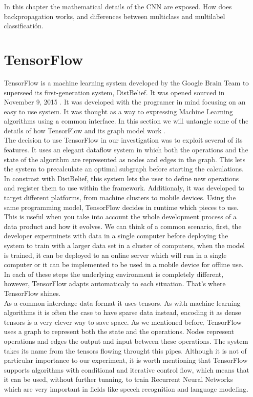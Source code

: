 In this chapter the mathematical details of the CNN are exposed. How does backpropagation works, and differences between multiclass and multilabel classificatión.

\section{TensorFlow}

TensorFlow is a machine learning system developed by the Google Brain Team to superseed its first-generation system, DistBelief. It was opened sourced in November 9, 2015 \cite{tensorflow2015-whitepaper}. It was developed with the programer in mind focusing on an easy to use system. It was thought as a way to expressing Machine Learning algorithms using a common interface. In this section we will untangle some of the details of how TensorFlow and its graph model work \cite{DBLP:journals/corr/AbadiBCCDDDGIIK16}.\\

The decision to use TensorFlow in our investigation was to exploit several of its features. It uses an elegant dataflow system in which both the operations and the state of the algorithm are represented as nodes and edges in the graph. This lets the system to precalculate an optimal subgraph before starting the calculations.\\

In constrast with DistBelief, this system lets the user to define new operations and register them to use within the framework. Additionaly, it was developed to target different platforms, from machine clusters to mobile devices. Using the same programming model, TensorFlow decides in runtime which pieces to use. This is useful when you take into account the whole development process of a data product and how it evolves. We can think of a common scenario, first, the developer experminets with data in a single computer before deploying the system to train with a larger data set in a cluster of computers, when the model is trained, it can be deployed to an online server which will run in a single computer or it can be implemented to be used in a mobile device for offline use. In each of these steps the underlying environment is completely different, however, TensorFlow adapts automaticaly to each situation. That's where TensorFlow shines.\\

As a common interchage data format it uses tensors. As with machine learning algorithms it is often the case to have sparse data instead, encoding it as dense tensors is a very clever way to save space. As we mentioned before, TensorFlow uses a graph to represent both the state and the operations. Nodes represent operations and edges the output and input between these operations. The system takes its name from the tensors flowing throught this pipes. Although it is not of particular importance to our experiment, it is worth mentioning that TensorFlow supports algorithms with conditional and iterative control flow, which means that it can be used, without further tunning, to train Recurrent Neural Networks which are very important in fields like speech recognition and language modeling.\\

